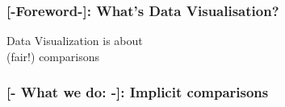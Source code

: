 \documentclass[xcolor=x11names,compress, aspectratio=169]{beamer}
\renewcommand{\(}{\begin{columns}}
\renewcommand{\)}{\end{columns}}
\newcommand{\<}[1]{\begin{column}{#1}}
\renewcommand{\>}{\end{column}}
\begin{document}
\begin{frame} %
\frametitle{\textcolor{brique}{[-Foreword-]}: What's Data Visualisation?}
\begin{center}

\huge{\textcolor{siap}{Data Visualization is about\\   (fair!)} \textcolor{brique}{comparisons}}
\end{center}
\end{frame}

\begin{frame} %
\frametitle{\textcolor{brique}{[- What we do: -]}: \textbf{Implicit} comparisons}
\begin{center}
\begin{itemize}
\end{itemize}
\end{center}
\end{frame}
\end{document}
